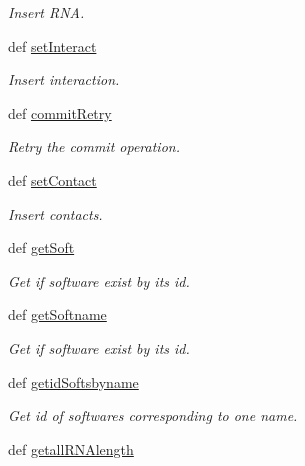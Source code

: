 \begin{DoxyCompactItemize}
\begin{DoxyCompactList}\small\item\em \-Insert \-R\-N\-A. \end{DoxyCompactList}\item 
def \hyperlink{classirna_1_1David2tulip_1_1Sqlite__manager_1_1Sqlite__manager_a536408af89be3891879fa70f1c62e8cc}{set\-Interact}
\begin{DoxyCompactList}\small\item\em \-Insert interaction. \end{DoxyCompactList}\item 
def \hyperlink{classirna_1_1David2tulip_1_1Sqlite__manager_1_1Sqlite__manager_a93c61c633700e264085da1c266bfd348}{commit\-Retry}
\begin{DoxyCompactList}\small\item\em \-Retry the commit operation. \end{DoxyCompactList}\item 
def \hyperlink{classirna_1_1David2tulip_1_1Sqlite__manager_1_1Sqlite__manager_a57a8c113883aa1450877fd0e89468d54}{set\-Contact}
\begin{DoxyCompactList}\small\item\em \-Insert contacts. \end{DoxyCompactList}\item 
def \hyperlink{classirna_1_1David2tulip_1_1Sqlite__manager_1_1Sqlite__manager_aa371c2cbc0524722fb10dd1fa22ba978}{get\-Soft}
\begin{DoxyCompactList}\small\item\em \-Get if software exist by its id. \end{DoxyCompactList}\item 
def \hyperlink{classirna_1_1David2tulip_1_1Sqlite__manager_1_1Sqlite__manager_aa39d13adbefe3b4765208cbaaf444bb8}{get\-Softname}
\begin{DoxyCompactList}\small\item\em \-Get if software exist by its id. \end{DoxyCompactList}\item 
def \hyperlink{classirna_1_1David2tulip_1_1Sqlite__manager_1_1Sqlite__manager_aaa2cda1fab1e8dd55009203907f75cfa}{getid\-Softsbyname}
\begin{DoxyCompactList}\small\item\em \-Get id of softwares corresponding to one name. \end{DoxyCompactList}\item 
def \hyperlink{classirna_1_1David2tulip_1_1Sqlite__manager_1_1Sqlite__manager_a0373626901afb4a6f02d26fcb64879bc}{getall\-R\-N\-Alength}

\end{DoxyCompactItemize}
